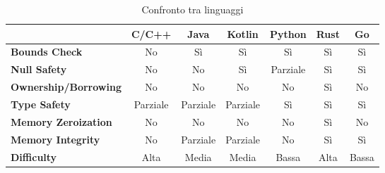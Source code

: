 \small
\setlength{\tabcolsep}{4pt}
\begin{table}[H]
  \centering
  \begin{tabular}{l|c|c|c|c|c|c|}
    \multicolumn{1}{l}{}         & \textbf{C/C++}                & \textbf{Java}                 & \textbf{Kotlin}               & \textbf{Python}               & \textbf{Rust}                       & \textbf{Go}               \\
    \hline
    \textbf{Bounds Check}        & \cellcolor{red!20}No          & \cellcolor{green!20}Sì        & \cellcolor{green!20}Sì        & \cellcolor{green!20}Sì        & \cellcolor{green!20}Sì              & \cellcolor{green!20}Sì    \\
    \textbf{Null Safety}         & \cellcolor{red!20}No          & \cellcolor{red!20}No          & \cellcolor{green!20}Sì        & \cellcolor{yellow!20}Parziale & \cellcolor{green!20}Sì              & \cellcolor{green!20}Sì    \\
    \textbf{Ownership/Borrowing} & \cellcolor{red!20}No          & \cellcolor{red!20}No          & \cellcolor{red!20}No          & \cellcolor{red!20}No          & \cellcolor{green!20}Sì              & \cellcolor{red!20}No      \\
    \textbf{Type Safety}         & \cellcolor{yellow!20}Parziale & \cellcolor{yellow!20}Parziale & \cellcolor{yellow!20}Parziale & \cellcolor{green!20}Sì        & \cellcolor{green!20}Sì              & \cellcolor{green!20}Sì    \\
    \textbf{Memory Zeroization}  & \cellcolor{red!20}No          & \cellcolor{red!20}No          & \cellcolor{red!20}No          & \cellcolor{red!20}No          & \cellcolor{green!20}Sì\footnotemark & \cellcolor{red!20}No      \\
    \textbf{Memory Integrity}    & \cellcolor{red!20}No          & \cellcolor{yellow!20}Parziale & \cellcolor{yellow!20}Parziale & \cellcolor{red!20}No          & \cellcolor{green!20}Sì              & \cellcolor{green!20}Sì    \\
    \textbf{Difficulty}          & \cellcolor{red!20}Alta        & \cellcolor{yellow!20}Media    & \cellcolor{yellow!20}Media    & \cellcolor{green!20}Bassa     & \cellcolor{red!20}Alta              & \cellcolor{green!20}Bassa \\
    \hline
  \end{tabular}
  \caption{Confronto tra linguaggi}
  \label{tab:linguaggi_memory_safety}
\end{table}



